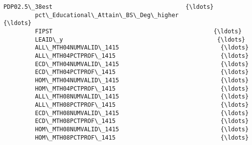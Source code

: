 \documentclass[11pt]{article}
\begin{document}
\begin{Verbatim}[commandchars=\\\{\}]
         PDP02.5\_38est                                      {\ldots}             
         pct\_Educational\_Attain\_BS\_Deg\_higher               {\ldots}             
         FIPST                                              {\ldots}             
         LEAID\_y                                            {\ldots}             
         ALL\_MTH04NUMVALID\_1415                             {\ldots}             
         ALL\_MTH04PCTPROF\_1415                              {\ldots}             
         ECD\_MTH04NUMVALID\_1415                             {\ldots}             
         ECD\_MTH04PCTPROF\_1415                              {\ldots}             
         HOM\_MTH04NUMVALID\_1415                             {\ldots}             
         HOM\_MTH04PCTPROF\_1415                              {\ldots}             
         ALL\_MTH08NUMVALID\_1415                             {\ldots}             
         ALL\_MTH08PCTPROF\_1415                              {\ldots}             
         ECD\_MTH08NUMVALID\_1415                             {\ldots}             
         ECD\_MTH08PCTPROF\_1415                              {\ldots}             
         HOM\_MTH08NUMVALID\_1415                             {\ldots}             
         HOM\_MTH08PCTPROF\_1415                              {\ldots}             
         

\end{Verbatim}
\end{document}
